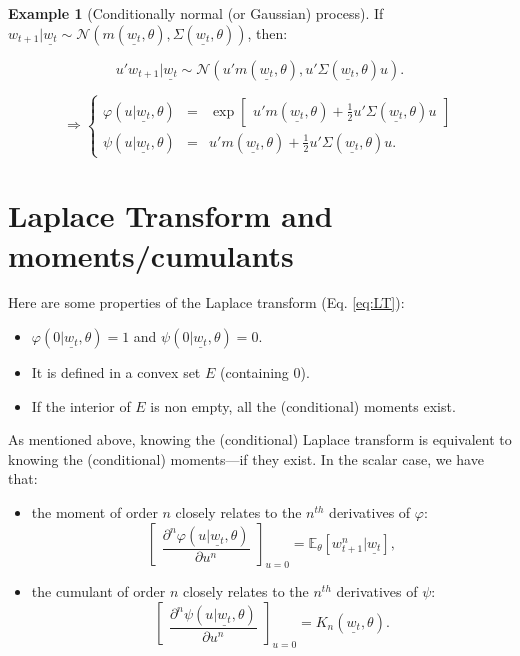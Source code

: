 \documentclass[
  12pt,
]{book}
\providecommand{\tightlist}{%
  \setlength{\itemsep}{0pt}\setlength{\parskip}{0pt}}
\theoremstyle{definition}
\theoremstyle{definition}
\newtheorem{example}{Example}[chapter]
\theoremstyle{definition}
\theoremstyle{definition}
\theoremstyle{remark}
\begin{document}
\begin{example}[Conditionally normal (or Gaussian) process]
\protect\hypertarget{exm:exGaussian}{}\label{exm:exGaussian}If \(w_{t+1}|\underline{w_t} \sim \mathcal{N}\left(m(\underline{w_t},\theta), \Sigma(\underline{w_t},\theta)\right)\), then:

\[
u'w_{t+1}|\underline{w_t} \sim \mathcal{N}\left(u'm(\underline{w_t},\theta), u'\Sigma(\underline{w_t},\theta)u\right).
\]

\[
\Rightarrow
\left\{
\begin{array}{ccc}
\varphi(u|\underline{w_t},\theta) &=& \exp\left[
\begin{array}{l} u'm(\underline{w_t},\theta)+
\frac{1}{2} u'\Sigma(\underline{w_t},\theta)u\end{array}
\right]\\
\psi(u|\underline{w_t},\theta) &=&
u'm(\underline{w_t},\theta) +  \frac{1}{2}
u'\Sigma(\underline{w_t},\theta)u.
\end{array}
\right.
\]
\end{example}

\hypertarget{AffineLaplace}{%
\section{Laplace Transform and moments/cumulants}\label{AffineLaplace}}

Here are some properties of the Laplace transform (Eq. \eqref{eq:LT}):

\begin{itemize}
\tightlist
\item
  \(\varphi(0|\underline{w_t},\theta) = 1\) and \(\psi(0|\underline{w_t},\theta)=0\).
\item
  It is defined in a convex set \(E\) (containing \(0\)).
\item
  If the interior of \(E\) is non empty, all the (conditional) moments exist.
\end{itemize}

As mentioned above, knowing the (conditional) Laplace transform is equivalent to knowing the (conditional) moments---if they exist. In the scalar case, we have that:

\begin{itemize}
\tightlist
\item
  the moment of order \(n\) closely relates to the \(n^{th}\) derivatives of \(\varphi\):
  \[
  \left[ \begin{array}{l}  \dfrac{\partial^n
  \varphi(u|\underline{w_t},\theta)}{\partial u^n}
  \end{array} \right]_{u=0} = \mathbb{E}_{\theta}[w^n_{t+1}|\underline{w_t}],
  \]
\item
  the cumulant of order \(n\) closely relates to the \(n^{th}\) derivatives of \(\psi\):
  \[
  \left[ \begin{array}{l}  \dfrac{\partial^n
  \psi(u|\underline{w_t},\theta)}{\partial u^n}
  \end{array} \right]_{u=0} = K_n(\underline{w_t},\theta).
  \]
\end{itemize}
\end{document}
